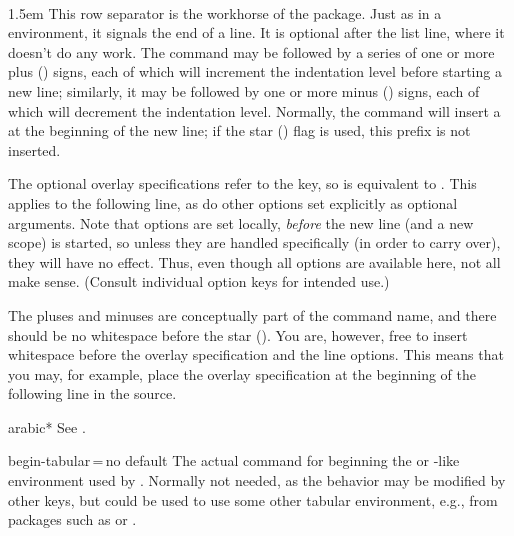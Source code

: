 \documentclass[a4paper]{article}
\def\refc{\refCom*}
\def\refe{\refEnv*}
\def\refk{\refKey*}
\begin{document}
\begin{docCommand}{\protect\bslash}{\,\colOpt{+}%
    \,\colOpt{-}%
    \,\colOpt{*}\,%
    \,}

    \parindent1.5em
    \noindent
    This row separator is the workhorse of the  package. Just as
    in a  environment, it signals the end of a line. It is
    optional after the list line, where it doesn't do any work.
%
    The command may be followed by a series of one or more plus (\code{+})
    signs, each of which will increment the indentation level before starting
    a new line; similarly, it may be followed by one or more minus (\code{-})
    signs, each of which will decrement the indentation level.
%
    Normally, the command will insert a \refk{prefix} at the beginning of the
    new line; if the star (\code{*}) flag is used, this prefix is not
    inserted.

    The optional overlay specifications refer to the \refk{hl} key, so
    \code{\refc{\bslash}<3>} is equivalent to \code{\refc{\bslash}[hl<3>]}.
    This applies to the following line, as do other options set explicitly as
    optional arguments. Note that options are set locally, \emph{before} the
    new line (and a new scope) is started, so unless they are handled
    specifically (in order to carry over), they will have no effect. Thus,
    even though all options are available here, not all make sense. (Consult
    individual option keys for intended use.)

    The pluses and minuses are conceptually part of the command name, and
    there should be no whitespace before the
    star (\code{*}).
    You are, however, free to insert whitespace before the overlay
    specification and the line options. This means that you may, for example,
    place the overlay specification at the beginning of the following line in
    the source.
\end{docCommand}

\begin{docCommand}{arabic*}{}
    See \refk{*}.
\end{docCommand}

\begin{docKey}{begin-tabular}{\,=\,}{no default}
    The actual command for beginning the  or -like
    environment used by \refe{pseudo}. Normally not needed, as the
     behavior may be modified by other keys, but could be used
    to use some other tabular environment, e.g., from packages such as
     or
    .
\end{docKey}
\end{document}
